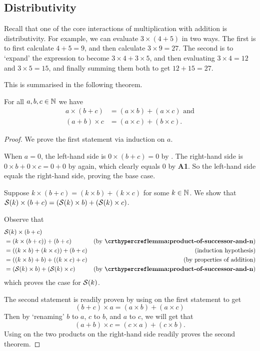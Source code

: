 \subsection{Distributivity}
Recall that one of the core interactions of multiplication with addition is distributivity. For example, we can evaluate $3 \times (4 + 5)$ in two ways. The first is to first calculate $4 + 5 = 9$, and then calculate $3 \times 9 = 27$. The second is to `expand' the expression to become $3 \times 4 + 3 \times 5$, and then evaluating $3 \times 4 = 12$ and $3 \times 5 = 15$, and finally summing them both to get $12 + 15 = 27$.

This is summarised in the following theorem.

\begin{theorem}\label{theorem:multiplication-distributivity-naturals}
    For all $a, b, c \in \mathbb{N}$ we have
    \begin{align*}
        a\times(b+c) &= (a\times b) + (a\times c) \text{ and}\\
        (a+b)\times c &= (a\times c) + (b\times c).
    \end{align*}
\end{theorem}
\begin{proof}
    We prove the first statement via induction on $a$.

    When $a = 0$, the left-hand side is $0\times(b+c) = 0$ by . The right-hand side is $0\times b + 0\times c = 0 + 0$ by  again, which clearly equals 0 by \textbf{A1}. So the left-hand side equals the right-hand side, proving the base case.

    Suppose $k\times(b+c) = (k\times b) + (k\times c)$ for some $k \in \mathbb{N}$. We show that ${\mathcal{S}(k)}\times(b+c) = ({\mathcal{S}(k)}\times b) + ({\mathcal{S}(k)} \times c)$.

    Observe that
    \begin{align*}
        &\Successor{k}\times(b+c)\\
        &= (k \times (b+c)) + (b+c) & (\text{by \myref{lemma:product-of-successor-and-n}})\\
        &= ((k\times b) + (k\times c)) + (b+c) & (\text{induction hypothesis})\\
        &= ((k\times b) + b) + ((k\times c) + c) & (\text{by properties of addition})\\
        &= (\Successor{k}\times b) + (\Successor{k} \times c) & (\text{by \myref{lemma:product-of-successor-and-n}})
    \end{align*}
    which proves the case for ${\mathcal{S}(k)}$.

    The second statement is readily proven by using  on the first statement to get
    \[
        (b+c)\times a = (a\times b) + (a\times c)
    \]
    Then by `renaming' $b$ to $a$, $c$ to $b$, and $a$ to $c$, we will get that
    \[
        (a+b)\times c = (c\times a) + (c\times b).
    \]
    Using  on the two products on the right-hand side readily proves the second theorem.
\end{proof}

